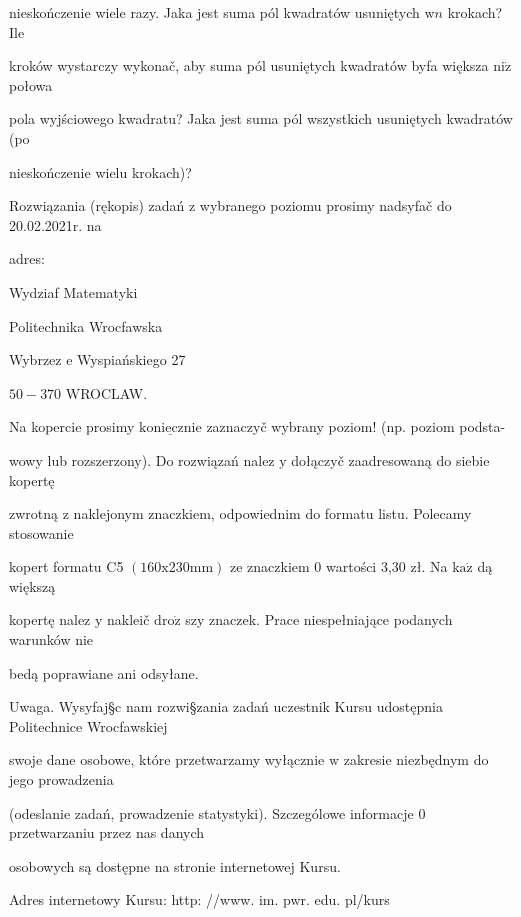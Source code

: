 \documentclass[a4paper,12pt]{article}
\begin{document}
nieskończenie wiele razy. Jaka jest suma pól kwadratów usuniętych $\mathrm{w}n$ krokach? Ile

kroków wystarczy wykonač, aby suma pól usuniętych kwadratów byfa większa $\mathrm{n}\mathrm{i}\dot{\mathrm{z}}$ połowa

pola wyjściowego kwadratu? Jaka jest suma pól wszystkich usuniętych kwadratów (po

nieskończenie wielu krokach)?

Rozwiązania (rękopis) zadań z wybranego poziomu prosimy nadsyfač do 20.02.2021r. na

adres:

Wydziaf Matematyki

Politechnika Wrocfawska

Wybrzez $\mathrm{e}$ Wyspiańskiego 27

$50-370$ WROCLAW.

Na kopercie prosimy $\underline{\mathrm{k}\mathrm{o}\mathrm{n}\mathrm{i}\mathrm{e}\mathrm{c}\mathrm{z}\mathrm{n}\mathrm{i}\mathrm{e}}$ zaznaczyč wybrany poziom! (np. poziom podsta-

wowy lub rozszerzony). Do rozwiązań nalez $\mathrm{y}$ dołączyč zaadresowaną do siebie kopertę

zwrotną $\mathrm{z}$ naklejonym znaczkiem, odpowiednim do formatu listu. Polecamy stosowanie

kopert formatu C5 $(160\mathrm{x}230\mathrm{m}\mathrm{m})$ ze znaczkiem $0$ wartości 3,30 zł. Na $\mathrm{k}\mathrm{a}\dot{\mathrm{z}}$ dą większą

kopertę nalez $\mathrm{y}$ nakleič $\mathrm{d}\mathrm{r}\mathrm{o}\dot{\mathrm{z}}$ szy znaczek. Prace niespełniające podanych warunków nie

bedą poprawiane ani odsyłane.

Uwaga. Wysyfaj\S c nam rozwi\S zania zadań uczestnik Kursu udostępnia Politechnice Wrocfawskiej

swoje dane osobowe, które przetwarzamy wyłącznie $\mathrm{w}$ zakresie niezbędnym do jego prowadzenia

(odeslanie zadań, prowadzenie statystyki). Szczególowe informacje $0$ przetwarzaniu przez nas danych

osobowych są dostępne na stronie internetowej Kursu.

Adres internetowy Kursu: http: //www. im. pwr. edu. pl/kurs
\end{document}
